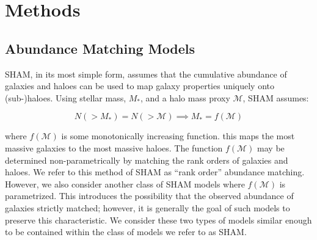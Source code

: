\documentclass[a4paper,fleqn,usenatbib]{mnras}
\begin{document}
\section{Methods}

\subsection{Abundance Matching Models}

SHAM, in its most simple form, assumes that the cumulative abundance of galaxies and haloes can be used to map galaxy properties uniquely onto (sub-)haloes.  Using stellar mass, $M_{*}$, and a halo mass proxy $\mathcal{M}$, SHAM assumes:
%
\begin{linenomath}
\begin{equation}
\label{eq:sham}
N(>M_*) = N(>\mathcal{M}) \implies M_{*} = f(\mathcal{M})
\end{equation} 
\end{linenomath}
%
where $f(\mathcal{M})$ is some monotonically increasing function.  this maps the most massive galaxies to the most massive haloes.  The function $f(\mathcal{M})$ may be determined non-parametrically by matching the rank orders of galaxies and haloes.  We refer to this method of SHAM as ``rank order'' abundance matching.  However, we also consider another class of SHAM models where $f(\mathcal{M})$ is parametrized.  This introduces the possibility that the observed abundance of galaxies strictly matched; however, it is generally the goal of such models to preserve this characteristic.  We consider these two types of models similar enough to be contained within the class of models we refer to as SHAM.
\end{document}
